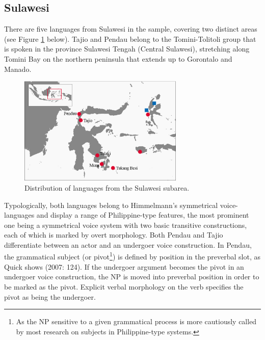 \subsection{Sulawesi}

There are five languages from Sulawesi in the sample, covering two distinct areas (see Figure \ref{map:Sul} below). Tajio and Pendau belong to the Tomini-Tolitoli group that is spoken in the province Sulawesi Tengah (Central Sulawesi), stretching along Tomini Bay on the northern peninsula that extends up to Gorontalo and Manado. 

\begin{figure}

\includegraphics[width=0.7\textwidth]{figures/Map_Sulawesi2.eps}
\caption{Distribution of languages from the Sulawesi subarea.}\label{map:Sul}

\end{figure}

Typologically, both languages belong to Himmelmann's symmetrical voice-languages and display a range of Philippine-type features, the most prominent one being a symmetrical voice system with two basic transitive constructions, each of which is marked by overt morphology. Both Pendau and Tajio differentiate between an actor and an undergoer voice construction. In Pendau, the grammatical subject (or pivot\footnote{As the NP sensitive to a given grammatical process is more cautiously called by most research on subjects in Philippine-type systems.}) is defined by position in the preverbal slot, as Quick shows (2007: 124). If the undergoer argument becomes the pivot in an undergoer voice construction, the NP is moved into preverbal position in order to be marked as the pivot. Explicit verbal morphology on the verb specifies the pivot as being the undergoer.

